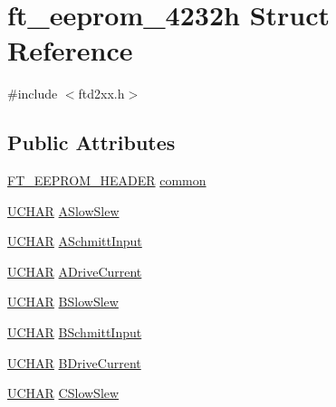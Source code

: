 \hypertarget{structft__eeprom__4232h}{}\section{ft\+\_\+eeprom\+\_\+4232h Struct Reference}
\label{structft__eeprom__4232h}


{\ttfamily \#include $<$ftd2xx.\+h$>$}

\subsection*{Public Attributes}
\begin{DoxyCompactItemize}
\item 
\hyperlink{LALUsbMLx64_2include_2ftd2xx_8h_ad5a6f519cd67a403fd8742756462394e}{F\+T\+\_\+\+E\+E\+P\+R\+O\+M\+\_\+\+H\+E\+A\+D\+ER} \hyperlink{structft__eeprom__4232h_acfee0a972954d9a20c82fcd18b082194}{common}
\item 
\hyperlink{CatCaloProto40MHz_2inc_2WinTypes_8h_a4f4bb67531a9bf6f0b9c6ad76aeba587}{U\+C\+H\+AR} \hyperlink{structft__eeprom__4232h_a1e66ea6b513734d830d86565441b6318}{A\+Slow\+Slew}
\item 
\hyperlink{CatCaloProto40MHz_2inc_2WinTypes_8h_a4f4bb67531a9bf6f0b9c6ad76aeba587}{U\+C\+H\+AR} \hyperlink{structft__eeprom__4232h_a47fdc0898935fa1d2c60cfcf93685231}{A\+Schmitt\+Input}
\item 
\hyperlink{CatCaloProto40MHz_2inc_2WinTypes_8h_a4f4bb67531a9bf6f0b9c6ad76aeba587}{U\+C\+H\+AR} \hyperlink{structft__eeprom__4232h_a67ec1ef6e8b91116d539dd304c9c6f53}{A\+Drive\+Current}
\item 
\hyperlink{CatCaloProto40MHz_2inc_2WinTypes_8h_a4f4bb67531a9bf6f0b9c6ad76aeba587}{U\+C\+H\+AR} \hyperlink{structft__eeprom__4232h_acd3e611ccee7fc8be7c459e6a436efda}{B\+Slow\+Slew}
\item 
\hyperlink{CatCaloProto40MHz_2inc_2WinTypes_8h_a4f4bb67531a9bf6f0b9c6ad76aeba587}{U\+C\+H\+AR} \hyperlink{structft__eeprom__4232h_a8bb143cc9d051960d4aa6fc9be3230d4}{B\+Schmitt\+Input}
\item 
\hyperlink{CatCaloProto40MHz_2inc_2WinTypes_8h_a4f4bb67531a9bf6f0b9c6ad76aeba587}{U\+C\+H\+AR} \hyperlink{structft__eeprom__4232h_ac42c22b82bdca1458089ac49f0eaefa1}{B\+Drive\+Current}
\item 
\hyperlink{CatCaloProto40MHz_2inc_2WinTypes_8h_a4f4bb67531a9bf6f0b9c6ad76aeba587}{U\+C\+H\+AR} \hyperlink{structft__eeprom__4232h_a6d92eb606cbe5c251751cd2d6fd8bebe}{C\+Slow\+Slew}
\item 

\end{DoxyCompactItemize}
